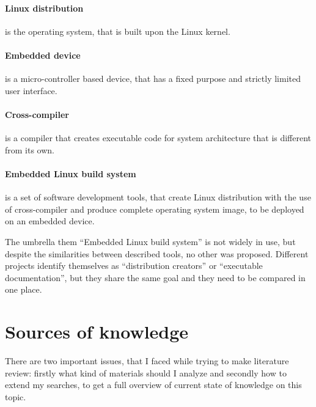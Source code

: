 \documentclass[printmode]{mgr}
\begin{document}
\paragraph{Linux distribution} is the operating system, that is built upon the Linux kernel.


\paragraph{Embedded device} is a micro-controller based device, that has a fixed purpose and strictly limited user interface.

\paragraph{Cross-compiler} is a compiler that creates executable code for system architecture that is different from its own.

\paragraph{Embedded Linux build system} is a set of software development tools, that create Linux distribution with the use of cross-compiler and produce complete operating system image, to be deployed on an embedded device.

The umbrella them ``Embedded Linux build system'' is not widely in use, but despite the similarities between described tools, no other was proposed. Different projects identify themselves as ``distribution creators'' or ``executable documentation'', but they share the same goal and they need to be compared in one place.

\section{Sources of knowledge}
\label{section:sources-of-knowledge}

There are two important issues, that I faced while trying to make literature review: firstly what kind of materials should I analyze and secondly how to extend my searches, to get a full overview of current state of knowledge on this topic.
\end{document}
